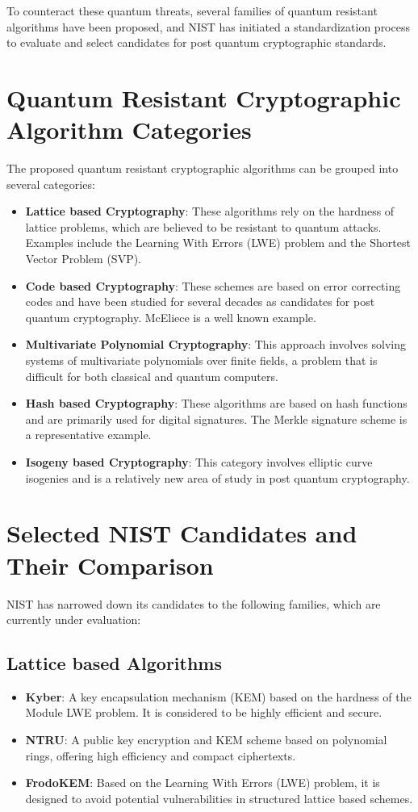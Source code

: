 \documentclass[a4paper,12pt]{article}
\begin{document}
To counteract these quantum threats, several families of quantum resistant algorithms have been proposed, and NIST has initiated a standardization process to evaluate and select candidates for post quantum cryptographic standards.

\section[Quantum Resistant Cryptographic Algorithm Categories]{Quantum Resistant Cryptographic\\ Algorithm Categories}
The proposed quantum resistant cryptographic algorithms can be grouped into several categories:
\begin{itemize}
    \item \textbf{Lattice based Cryptography}: These algorithms rely on the hardness of lattice problems, which are believed to be resistant to quantum attacks. Examples include the Learning With Errors (LWE) problem and the Shortest Vector Problem (SVP).
    \item \textbf{Code based Cryptography}: These schemes are based on error correcting codes and have been studied for several decades as candidates for post quantum cryptography. McEliece is a well known example.
    \item \textbf{Multivariate Polynomial Cryptography}: This approach involves solving systems of multivariate polynomials over finite fields, a problem that is difficult for both classical and quantum computers.
    \item \textbf{Hash based Cryptography}: These algorithms are based on hash functions and are primarily used for digital signatures. The Merkle signature scheme is a representative example.
    \item \textbf{Isogeny based Cryptography}: This category involves elliptic curve isogenies and is a relatively new area of study in post quantum cryptography.
\end{itemize}

\section{Selected NIST Candidates and Their Comparison}
NIST has narrowed down its candidates to the following families, which are currently under evaluation:

\subsection{Lattice based Algorithms}
\begin{itemize}
    \item \textbf{Kyber}: A key encapsulation mechanism (KEM) based on the hardness of the Module LWE problem. It is considered to be highly efficient and secure.
    \item \textbf{NTRU}: A public key encryption and KEM scheme based on polynomial rings, offering high efficiency and compact ciphertexts.
    \item \textbf{FrodoKEM}: Based on the Learning With Errors (LWE) problem, it is designed to avoid potential vulnerabilities in structured lattice based schemes.
\end{itemize}
\end{document}
